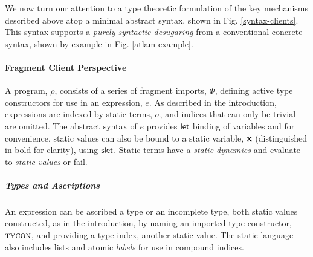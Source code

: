 \documentclass[9pt,preprint]{sigplanconf}
\newcommand{\FF}[1]{{\sf #1}}
\begin{document}


%

We now turn our attention to a type theoretic formulation of the key mechanisms described above atop a minimal abstract syntax, shown in Fig. \ref{syntax-clients}. This syntax supports a \emph{purely syntactic desugaring} from a conventional concrete syntax, shown by example in Fig. \ref{atlam-example}. 

\paragraph{Fragment Client Perspective} A program, $\rho$, consists of a series of fragment imports, $\Phi$, defining active type constructors for use in an expression, $e$. As described in the introduction, expressions are indexed by static terms, $\sigma$, and indices that can only be trivial are omitted. The abstract syntax of $e$ provides $\FF{let}$ binding of variables and for convenience, static values can also be bound to a static variable, ${\textbf{x}}$ (distinguished in bold for clarity), using $\FF{slet}$. Static terms have a \emph{static dynamics} and evaluate to \emph{static values} or fail.

\subparagraph{Types and Ascriptions} An expression can be ascribed a {type} or an {incomplete type}, both  {static values} constructed, as in the introduction, by naming an imported type constructor, $\textsc{tycon}$, and providing a type index, another static value. The static language also includes lists and atomic \emph{labels} for use in compound indices. %
\end{document}
